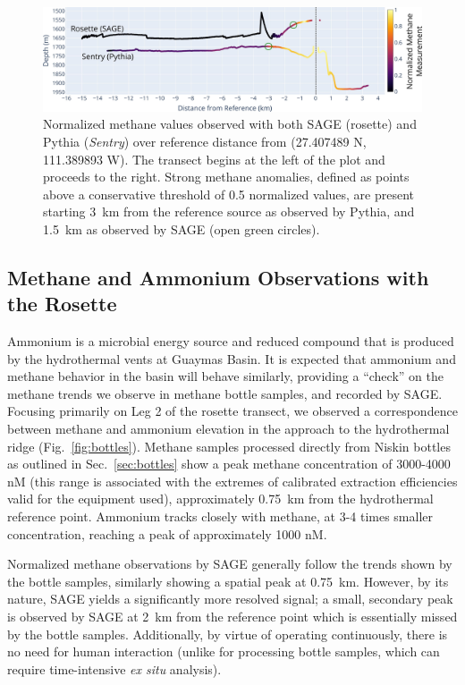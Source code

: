 \begin{figure}[h!]
    \centering
    \includegraphics[width=1\columnwidth]{figures/chap3_methane_over_distance.jpg}
    \caption{Normalized methane values observed with both SAGE (rosette) and Pythia (\emph{Sentry}) over reference distance from (27.407489 N, 111.389893 W). The transect begins at the left of the plot and proceeds to the right. Strong methane anomalies, defined as points above a conservative threshold of 0.5 normalized values, are present starting \SI{3}{\kilo\meter} from the reference source as observed by Pythia, and \SI{1.5}{\kilo\meter} as observed by SAGE (open green circles).}
    \label{fig:methane_distance}
\end{figure}


\subsection{Methane and Ammonium Observations with the Rosette}
Ammonium is a microbial energy source and reduced compound that is produced by the hydrothermal vents at Guaymas Basin. It is expected that ammonium and methane behavior in the basin will behave similarly, providing a ``check'' on the methane trends we observe in methane bottle samples, and recorded by SAGE. Focusing primarily on Leg 2 of the rosette transect, we observed a correspondence between methane and ammonium elevation in the approach to the hydrothermal ridge (Fig.~\ref{fig:bottles}). Methane samples processed directly from Niskin bottles as outlined in Sec.~\ref{sec:bottles} show a peak methane concentration of 3000-4000 nM (this range is associated with the extremes of calibrated extraction efficiencies valid for the equipment used), approximately \SI{0.75}{\kilo\meter} from the hydrothermal reference point. Ammonium tracks closely with methane, at 3-4 times smaller concentration, reaching a peak of approximately 1000 nM. 

Normalized methane observations by SAGE generally follow the trends shown by the bottle samples, similarly showing a spatial peak at \SI{0.75}{\kilo\meter}. However, by its nature, SAGE yields a significantly more resolved signal; a small, secondary peak is observed by SAGE at \SI{2}{\kilo\meter} from the reference point which is essentially missed by the bottle samples. Additionally, by virtue of operating continuously, there is no need for human interaction (unlike for processing bottle samples, which can require time-intensive \emph{ex situ} analysis). 

